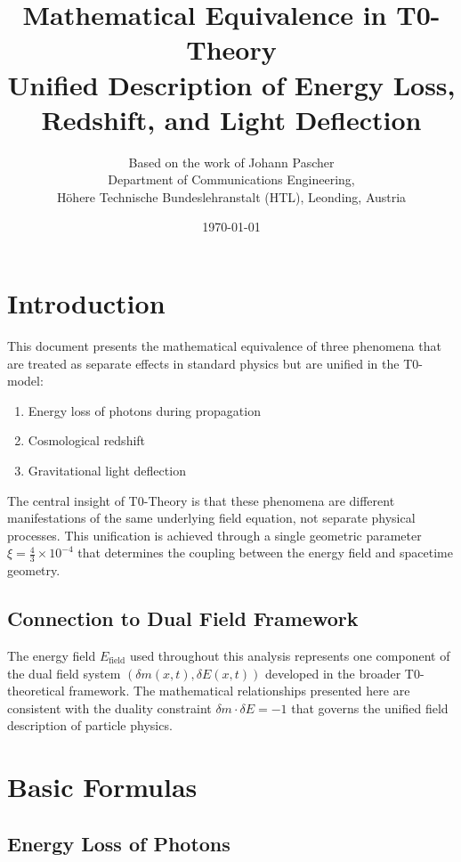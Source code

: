 \documentclass[12pt,a4paper]{article}
\title{\Huge\textbf{Mathematical Equivalence in T0-Theory}\\\Large Unified Description of Energy Loss, Redshift, and Light Deflection}
\author{Based on the work of Johann Pascher\\
	Department of Communications Engineering, \\Höhere Technische Bundeslehranstalt (HTL), Leonding, Austria}
\date{\today}
\newcommand{\efield}{E_{\text{field}}}
\theoremstyle{definition}
\begin{document}
	
	\maketitle
	\tableofcontents
	\thispagestyle{fancy}
	\newpage
	
	\section{Introduction}
	
	This document presents the mathematical equivalence of three phenomena that are treated as separate effects in standard physics but are unified in the T0-model:
	
	\begin{enumerate}
		\item Energy loss of photons during propagation
		\item Cosmological redshift
		\item Gravitational light deflection
	\end{enumerate}
	
	The central insight of T0-Theory is that these phenomena are different manifestations of the same underlying field equation, not separate physical processes. This unification is achieved through a single geometric parameter $\xi = \frac{4}{3} \times 10^{-4}$ that determines the coupling between the energy field and spacetime geometry.
	
	\subsection{Connection to Dual Field Framework}
	
	The energy field $\efield$ used throughout this analysis represents one component of the dual field system $(\delta m(x,t), \delta E(x,t))$ developed in the broader T0-theoretical framework. The mathematical relationships presented here are consistent with the duality constraint $\delta m \cdot \delta E = -1$ that governs the unified field description of particle physics.
	
	\section{Basic Formulas}
	
	\subsection{Energy Loss of Photons}
	
\end{document}
